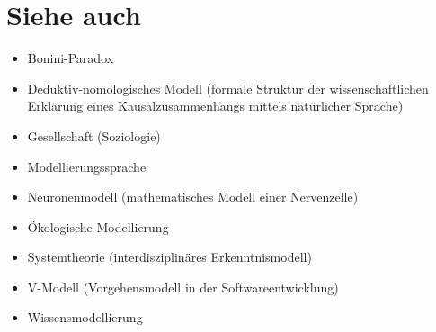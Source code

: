 \documentclass[a4paper, 12pt, pagesize]{scrartcl}
\begin{document}
\section{Siehe auch}

\begin{itemize}
    \item Bonini-Paradox
    \item Deduktiv-nomologisches Modell (formale Struktur der wissenschaftlichen Erklärung eines Kausalzusammenhangs mittels natürlicher Sprache)
    \item Gesellschaft (Soziologie)
    \item Modellierungssprache
    \item Neuronenmodell (mathematisches Modell einer Nervenzelle)
    \item Ökologische Modellierung
    \item Systemtheorie (interdisziplinäres Erkenntnismodell)
    \item V-Modell (Vorgehensmodell in der Softwareentwicklung)
    \item Wissensmodellierung
\end{itemize}
\end{document}
